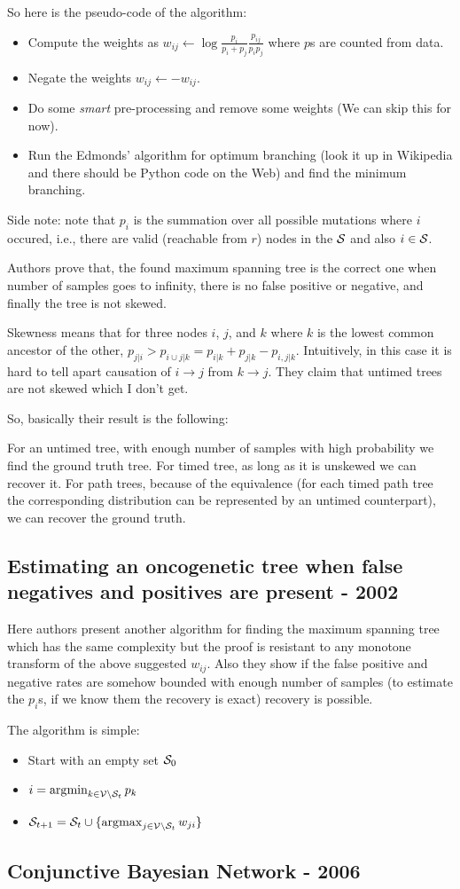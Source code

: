 	So here is the pseudo-code of the algorithm:
	\begin{itemize}
		\item Compute the weights as $w_{ij} \leftarrow \log \frac{p_i}{p_i + p_j} \frac{p_{ij}}{p_i p_j}$ where $p$s are counted from data. 
		\item Negate the weights $w_{ij}  \leftarrow -w_{ij} $. 
		\item Do some \emph{smart} pre-processing and remove some weights (We can skip this for now). 
		\item Run the Edmonds' algorithm for optimum branching (look it up in Wikipedia and there should be Python code on the Web) and find the minimum branching. 
	\end{itemize}
	
	Side note: note that $p_i$ is the summation over all possible mutations where $i$ occured, i.e., there are valid (reachable from $r$) nodes in the ${\cal S}$ and also $i \in {\cal S}$. 
	
	Authors prove that, the found maximum spanning tree is the correct one when number of samples goes to infinity, there is no false positive or negative, and finally the tree is not skewed. 
	
	Skewness means that for three nodes $i$, $j$, and $k$ where $k$ is the lowest common ancestor of the other, $p_{j|i} > p_{i\cup j|k} = p_{i|k} + p_{j|k} - p_{i, j|k}$. 
	Intuitively, in this case it is hard to tell apart causation of $i\rightarrow j$ from $k\rightarrow j$. 
	They claim that untimed trees are not skewed which I don't get. 
	
	So, basically their result is the following:
	
	For an untimed tree, with enough number of samples with high probability we find the ground truth tree. 
	For timed tree, as long as it is unskewed we can recover it. 
	For path trees, because of the equivalence (for each timed path tree the corresponding distribution can be represented by an untimed counterpart), we can recover the ground truth. 
	
	
	
	
	\subsection{Estimating an oncogenetic tree when false negatives and positives are present - 2002}
	
	Here authors present another algorithm for finding the maximum spanning tree which has the same complexity but the proof is resistant to any monotone transform of the above suggested $w_{ij}$. 
	Also they show if the false positive and negative rates are somehow bounded with enough number of samples (to estimate the $p_i$s, if we know them the recovery is exact) recovery is possible. 
	
	The algorithm is simple:
	\begin{itemize}
		\item Start with an empty set ${\cal S}_0$
		\item $i =  \operatorname*{\arg\!\min}_{k \in {\cal V} \setminus {\cal S}_t} p_k $
		\item ${\cal S}_{t+1} = {\cal S}_t \cup \{\operatorname*{\arg\!\max}_{j \in {\cal V} \setminus {\cal S}_t} w_{ji}\} $
	\end{itemize}
	
	
	
	\subsection{Conjunctive Bayesian Network - 2006}
	
	